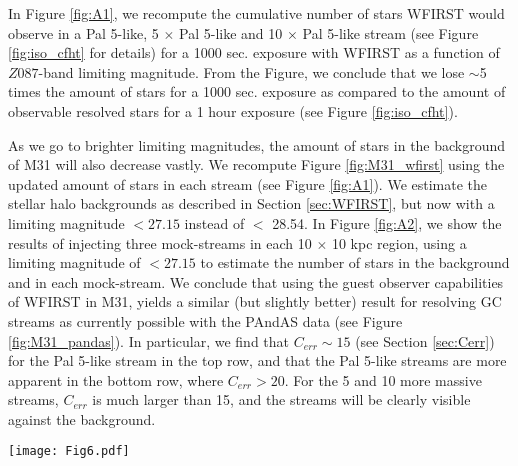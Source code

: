 \documentclass[twocolumn]{aastex62}
\begin{document}
In Figure \ref{fig:A1}, we recompute the cumulative number of stars WFIRST would observe in a Pal 5-like, 5 $\times$ Pal 5-like and 10 $\times$ Pal 5-like stream (see Figure \ref{fig:iso_cfht} for details) for a 1000 sec. exposure with WFIRST as a function of  $Z087$-band limiting magnitude. From the Figure, we conclude that we lose $\sim$5 times the amount of stars for a 1000 sec. exposure as compared to the amount of observable resolved stars for a 1 hour exposure (see Figure \ref{fig:iso_cfht}). 

As we go to brighter limiting magnitudes, the amount of stars in the background of M31 will also decrease vastly. We recompute Figure \ref{fig:M31_wfirst} using the updated amount of stars in each stream (see Figure \ref{fig:A1}). We estimate the stellar halo backgrounds as described in Section \ref{sec:WFIRST}, but now with a limiting magnitude $< 27.15$ instead of $< $ 28.54. In Figure \ref{fig:A2}, we show the results of injecting three mock-streams in each 10 $\times$ 10 kpc region, using a limiting magnitude of $< 27.15$ to estimate the number of stars in the background and in each mock-stream.  
We conclude that using the guest observer capabilities of WFIRST in M31, yields a similar (but slightly better) result for resolving GC streams as currently possible with the PAndAS data (see Figure \ref{fig:M31_pandas}). In particular, we find that $C_{err} \sim 15$ (see Section \ref{sec:Cerr}) for the Pal 5-like stream in the top row, and that the Pal 5-like streams are more apparent in the bottom row, where $C_{err} > 20$. For the 5 and 10 more massive streams, $C_{err}$ is much larger than 15, and the streams will be clearly visible against the background.



\begin{figure*}
\centerline{\texttt{[image: Fig6.pdf]}}
\caption{The cumulative number of stars in a Pal 5-like stream (solid line), a 5 $\times$  more massive Pal 5-like stream (dotted line), and a 10 $\times$  more massive Pal 5-like stream (dashed line) for a given limiting $Z$-mag. The vertical lines show the limiting magnitude of WFIRST for a 1 hour exposure ($Z087 < 27.15$) at the distance of M31 (i.e. shifted by 7.66 magnitudes from Pal 5's current location), and at the distance of Pal 5 in the Milky Way. We indicate the amount of stars WFIRST should be able to observe for the Pal 5-like, 5  $\times$ Pal 5-like and 10 $\times$ Pal 5-like stream in M31 (see n$^*$). 
} 
\label{fig:A1}
\end{figure*}
\end{document}
